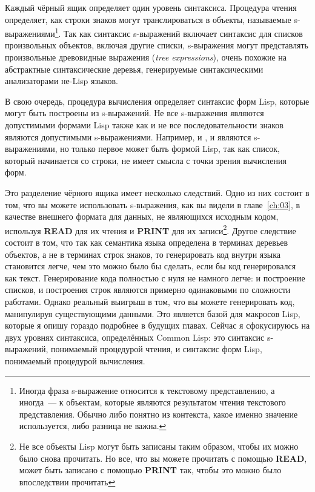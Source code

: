 Каждый чёрный ящик определяет один уровень синтаксиса. Процедура чтения определяет, как
строки знаков могут транслироваться в объекты, называемые s-выражениями\footnote{Иногда
  фраза s-выражение относится к текстовому представлению, а иногда~--- к объектам, которые
  являются результатом чтения текстового представления. Обычно либо понятно из контекста,
  какое именно значение используется, либо разница не важна.}. Так как синтаксис
s-выражений включает синтаксис для списков произвольных объектов, включая другие списки,
s-выражения могут представлять произвольные древовидные выражения (\textit{tree
  expressions}), очень похожие на абстрактные синтаксические деревья, генерируемые
синтаксическими анализаторами не-Lisp языков.

В свою очередь, процедура вычисления определяет синтаксис форм Lisp, которые могут быть
построены из s-выражений. Не все s-выражения являются допустимыми формами Lisp также как и
не все последовательности знаков являются допустимыми s-выражениями. Например, и
, и  являются s-выражениями, но только первое может быть
формой Lisp, так как список, который начинается со строки, не имеет смысла с точки зрения
вычисления форм.

Это разделение чёрного ящика имеет несколько следствий. Одно из них состоит в том, что вы
можете использовать s-выражения, как вы видели в главе~\ref{ch:03}, в качестве внешнего формата для
данных, не являющихся исходным кодом, используя \textbf{READ} для их чтения и
\textbf{PRINT} для их записи\footnote{Не все объекты Lisp могут быть записаны таким
  образом, чтобы их можно было снова прочитать. Но все, что вы можете прочитать с помощью
  \textbf{READ}, может быть записано с помощью \textbf{PRINT} так, чтобы это можно было
  впоследствии прочитать}. Другое следствие состоит в том, что так как семантика языка
определена в терминах деревьев объектов, а не в терминах строк знаков, то генерировать код
внутри языка становится легче, чем это можно было бы сделать, если бы код генерировался
как текст. Генерирование кода полностью с нуля не намного легче: и построение списков, и
построения строк являются примерно одинаковыми по сложности работами. Однако реальный
выигрыш в том, что вы можете генерировать код, манипулируя существующими данными. Это
является базой для макросов Lisp, которые я опишу гораздо подробнее в будущих
главах. Сейчас я сфокусируюсь на двух уровнях синтаксиса, определённых Common Lisp: это
синтаксис s-выражений, понимаемый процедурой чтения, и синтаксис форм Lisp, понимаемый
процедурой вычисления.

